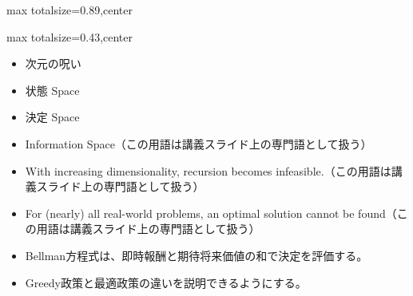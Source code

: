 \begin{minipage}[t]{0.58\textwidth}
\begin{adjustbox}{max totalsize={\textwidth}{0.89\textheight},center}
\begin{minipage}{\textwidth}
\end{minipage}
\end{adjustbox}
\end{minipage}


\clearpage
{}
\begin{minipage}[t]{0.405\textwidth}
\begin{adjustbox}{max totalsize={\textwidth}{0.43\textheight},center}
\begin{minipage}{\textwidth}\scriptsize
{}\begin{itemize}
\item 次元の呪い
\item 状態 Space
\item 決定 Space
\item Information Space（この用語は講義スライド上の専門語として扱う）
\item With increasing dimensionality, recursion becomes infeasible.（この用語は講義スライド上の専門語として扱う）
\item For (nearly) all real-world problems, an optimal solution cannot be found（この用語は講義スライド上の専門語として扱う）
\end{itemize}\begin{itemize}
\item Bellman方程式は、即時報酬と期待将来価値の和で決定を評価する。
\item Greedy政策と最適政策の違いを説明できるようにする。
\end{itemize}
\end{minipage}
\end{adjustbox}
\end{minipage}\hfill
